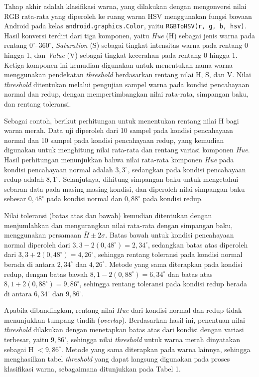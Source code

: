 Tahap akhir adalah klasifikasi warna, yang dilakukan dengan mengonversi nilai RGB rata-rata yang diperoleh ke ruang warna HSV menggunakan fungsi bawaan Android pada kelas \texttt{android.graphics.Color}, yaitu \texttt{RGBToHSV(r, g, b, hsv)}. Hasil konversi terdiri dari tiga komponen, yaitu \textit{Hue} (H) sebagai jenis warna pada rentang $0^\circ$--$360^\circ$, \textit{Saturation} (S) sebagai tingkat intensitas warna pada rentang 0 hingga 1, dan \textit{Value} (V) sebagai tingkat kecerahan pada rentang 0 hingga 1. Ketiga komponen ini kemudian digunakan untuk menentukan nama warna menggunakan pendekatan \textit{threshold} berdasarkan rentang nilai H, S, dan V. Nilai \textit{threshold} ditentukan melalui pengujian sampel warna pada kondisi pencahayaan normal dan redup, dengan mempertimbangkan nilai rata-rata, simpangan baku, dan rentang toleransi.

Sebagai contoh, berikut perhitungan untuk menentukan rentang nilai H bagi warna merah. Data uji diperoleh dari 10 sampel pada kondisi pencahayaan normal dan 10 sampel pada kondisi pencahayaan redup, yang kemudian digunakan untuk menghitung nilai rata-rata dan rentang variasi komponen \textit{Hue}. Hasil perhitungan menunjukkan bahwa nilai rata-rata komponen \textit{Hue} pada kondisi pencahayaan normal adalah $3,3^\circ$, sedangkan pada kondisi pencahayaan redup adalah $8,1^\circ$. Selanjutnya, dihitung simpangan baku untuk mengetahui sebaran data pada masing-masing kondisi, dan diperoleh nilai simpangan baku sebesar $0,48^\circ$ pada kondisi normal dan $0,88^\circ$ pada kondisi redup.

Nilai toleransi (batas atas dan bawah) kemudian ditentukan dengan menjumlahkan dan mengurangkan nilai rata-rata dengan simpangan baku, menggunakan persamaan $\bar{H} \pm 2\sigma$. Batas bawah untuk kondisi pencahayaan normal diperoleh dari $3,3 - 2(0,48^\circ) = 2,34^\circ$, sedangkan batas atas diperoleh dari $3,3 + 2(0,48^\circ) = 4,26^\circ$, sehingga rentang toleransi pada kondisi normal berada di antara $2,34^\circ$ dan $4,26^\circ$. Metode yang sama diterapkan pada kondisi redup, dengan batas bawah $8,1 - 2(0,88^\circ) = 6,34^\circ$ dan batas atas $8,1 + 2(0,88^\circ) = 9,86^\circ$, sehingga rentang toleransi pada kondisi redup berada di antara $6,34^\circ$ dan $9,86^\circ$.

Apabila dibandingkan, rentang nilai \textit{Hue} dari kondisi normal dan redup tidak menunjukkan tumpang tindih (\textit{overlap}). Berdasarkan hasil ini, penentuan nilai \textit{threshold} dilakukan dengan menetapkan batas atas dari kondisi dengan variasi terbesar, yaitu $9,86^\circ$, sehingga nilai \textit{threshold} untuk warna merah dinyatakan sebagai H $< 9,86^\circ$. Metode yang sama diterapkan pada warna lainnya, sehingga menghasilkan tabel \textit{threshold} yang dapat langsung digunakan pada proses klasifikasi warna, sebagaimana ditunjukkan pada Tabel 1.

